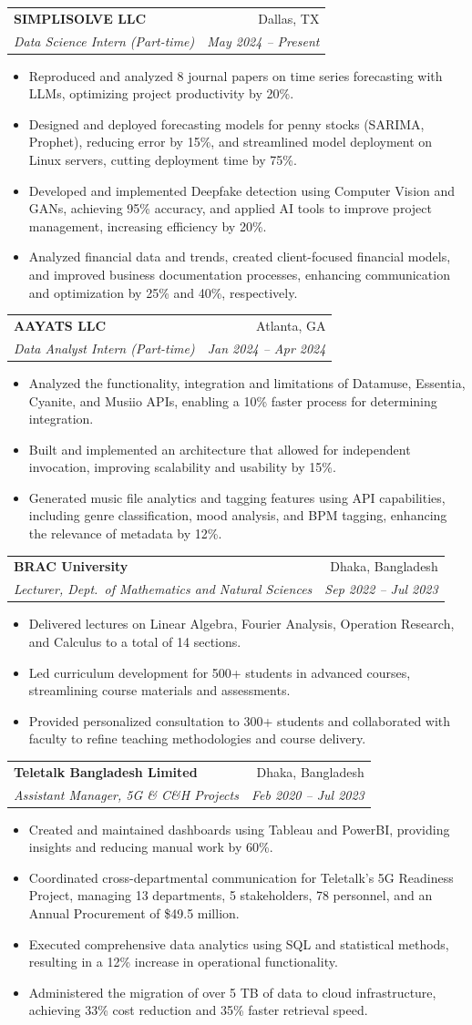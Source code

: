 \documentclass[letterpaper,10pt]{article}
\makeatletter
\newcommand{\resumeItem}[1]{\item\small{#1 \vspace{-2pt}}}
\newcommand{\resumeSubheading}[4]{
  \vspace{-2pt}\item
    \begin{tabular*}{\textwidth}[t]{l@{\extracolsep{\fill}}r}
      \textbf{#1} & #2 \\
      \textit{\small#3} & \textit{\small #4} \\
    \end{tabular*}\vspace{-7pt}
}
\newcommand{\resumeItemListStart}{\begin{itemize}[leftmargin=0.15in]}
\newcommand{\resumeItemListEnd}{\end{itemize}\vspace{2pt}}
\makeatother
\begin{document}
  \resumeSubheading{SIMPLISOLVE LLC}{Dallas, TX}{Data Science Intern (Part-time)}{May 2024 -- Present}
  \resumeItemListStart
    \resumeItem{Reproduced and analyzed 8 journal papers on time series forecasting with LLMs, optimizing project productivity by 20\%.}
    \resumeItem{Designed and deployed forecasting models for penny stocks (SARIMA, Prophet), reducing error by 15\%, and streamlined model
      deployment on Linux servers, cutting deployment time by 75\%.}
    \resumeItem{Developed and implemented Deepfake detection using Computer Vision and GANs, achieving 95\% accuracy, and applied AI
      tools to improve project management, increasing efficiency by 20\%.}
    \resumeItem{Analyzed financial data and trends, created client-focused financial models, and improved business documentation processes,
      enhancing communication and optimization by 25\% and 40\%, respectively.}
  \resumeItemListEnd

  \resumeSubheading{AAYATS LLC}{Atlanta, GA}{Data Analyst Intern (Part-time)}{Jan 2024 -- Apr 2024}
  \resumeItemListStart
    \resumeItem{Analyzed the functionality, integration and limitations of Datamuse, Essentia, Cyanite, and Musiio APIs, enabling a 10\%
      faster process for determining integration.}
    \resumeItem{Built and implemented an architecture that allowed for independent invocation, improving scalability and usability by 15\%.}
    \resumeItem{Generated music file analytics and tagging features using API capabilities, including genre classification, mood analysis,
      and BPM tagging, enhancing the relevance of metadata by 12\%.}
  \resumeItemListEnd

  \resumeSubheading{BRAC University}{Dhaka, Bangladesh}{Lecturer, Dept.\ of Mathematics and Natural Sciences}{Sep 2022 -- Jul 2023}
  \resumeItemListStart
    \resumeItem{Delivered lectures on Linear Algebra, Fourier Analysis, Operation Research, and Calculus to a total of 14 sections.}
    \resumeItem{Led curriculum development for 500+ students in advanced courses, streamlining course materials and assessments.}
    \resumeItem{Provided personalized consultation to 300+ students and collaborated with faculty to refine teaching methodologies and course delivery.}
  \resumeItemListEnd

  \resumeSubheading{Teletalk Bangladesh Limited}{Dhaka, Bangladesh}{Assistant Manager, 5G \& C\&H Projects}{Feb 2020 -- Jul 2023}
  \resumeItemListStart
    \resumeItem{Created and maintained dashboards using Tableau and PowerBI, providing insights and reducing manual work by 60\%.}
    \resumeItem{Coordinated cross-departmental communication for Teletalk's 5G Readiness Project, managing 13 departments, 5 stakeholders,
      78 personnel, and an Annual Procurement of \$49.5 million.}
    \resumeItem{Executed comprehensive data analytics using SQL and statistical methods, resulting in a 12\% increase in operational functionality.}
    \resumeItem{Administered the migration of over 5 TB of data to cloud infrastructure, achieving 33\% cost reduction and 35\% faster retrieval speed.}
  \resumeItemListEnd
\end{document}
